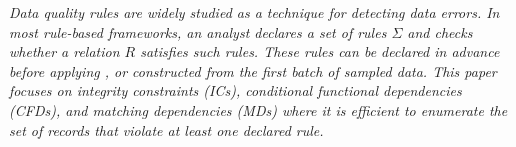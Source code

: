 \vspace{0.5em}

\emph{Data quality rules are widely studied as a technique for detecting data errors.
In most rule-based frameworks, an analyst declares a set of rules $\Sigma$ and checks whether a relation $R$ satisfies such rules.
These rules can be declared in advance before applying \sys, or constructed from the first batch of sampled data.
This paper focuses on integrity constraints (ICs), conditional functional dependencies (CFDs), and matching dependencies (MDs) where it is efficient to enumerate the set of records that violate at least one declared rule. }


